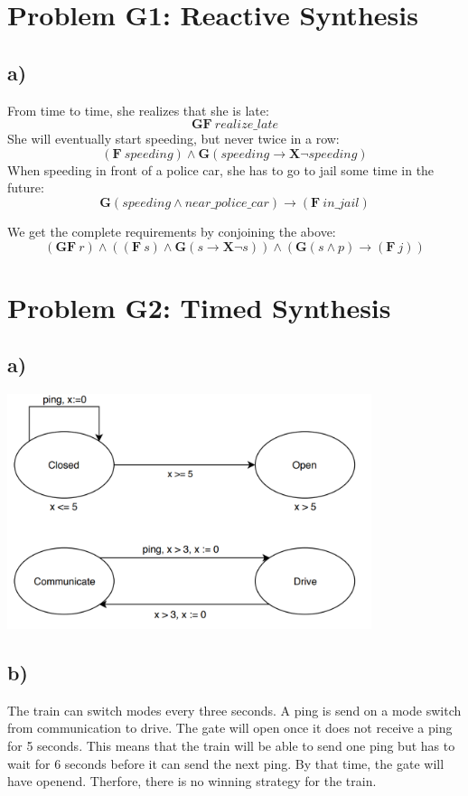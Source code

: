 \documentclass[12pt]{article}
\begin{document}
\lstset{language=C++}


\section*{Problem G1: Reactive Synthesis}
\subsection*{a)}
From time to time, she realizes that she is late:
\[ \mathbf{GF} \: realize\_late \]
She will eventually start speeding, but never twice in a row:
\[ (\mathbf{F} \: speeding) \land \mathbf{G}(speeding \rightarrow \mathbf{X} \neg speeding) \]
When speeding in front of a police car, she has to go to jail some time in the future:
\[ \mathbf{G}(speeding \land near\_police\_car) \rightarrow (\mathbf{F} \: in\_jail) \]

We get the complete requirements by conjoining the above:
\[ (\mathbf{GF} \: r) \land ((\mathbf{F} \: s) \land \mathbf{G}(s \rightarrow \mathbf{X} \neg s)) \land (\mathbf{G}(s \land p) \rightarrow (\mathbf{F} \: j)) \]

\section*{Problem G2: Timed Synthesis}
\subsection*{a)}
\includegraphics[width=0.8\textwidth]{TA.png}

\subsection*{b)}
The train can switch modes every three seconds. A ping is send on a mode switch from communication to drive. The gate will open once it does not receive a ping for 5 seconds. This means that the train will be able to send one ping but has to wait for 6 seconds before it can send the next ping. By that time, the gate will have openend. Therfore, there is no winning strategy for the train.
\end{document}
